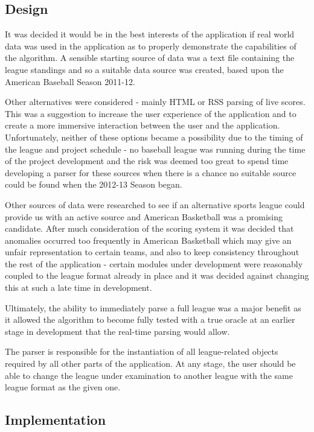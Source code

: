 \subsection{Design}

It was decided it would be in the best interests of the application if
real world data was used in the application as to properly demonstrate
the capabilities of the algorithm. A sensible starting source of data
was a text file containing the league standings and so a suitable data
source was created, based upon the American Baseball Season
2011-12.

Other alternatives were considered - mainly HTML or RSS parsing of
live scores. This was a suggestion to increase the user experience of
the application and to create a more immersive interaction between the
user and the application. Unfortunately, neither of these options
became a possibility due to the timing of the league and project
schedule - no baseball league was running during the time of the
project development and the risk was deemed too great to spend time
developing a parser for these sources when there is a chance no
suitable source could be found when the 2012-13 Season began.

Other sources of data were researched to see if an alternative sports
league could provide us with an active source and American Basketball
was a promising candidate. After much consideration of the scoring
system it was decided that anomalies occurred too frequently in
American Basketball which may give an unfair representation to
certain teams, and also to keep consistency throughout the rest of the
application - certain modules under development were reasonably
coupled to the league format already in place and it was decided
against changing this at such a late time in development.

Ultimately, the ability to immediately parse a full league was a major
benefit as it allowed the algorithm to become fully tested with a true
oracle at an earlier stage in development that the real-time parsing
would allow.

The parser is responsible for the instantiation of all league-related
objects required by all other parts of the application. At any stage,
the user should be able to change the league under examination to
another league with the same league format as the given one.

\subsection{Implementation}

